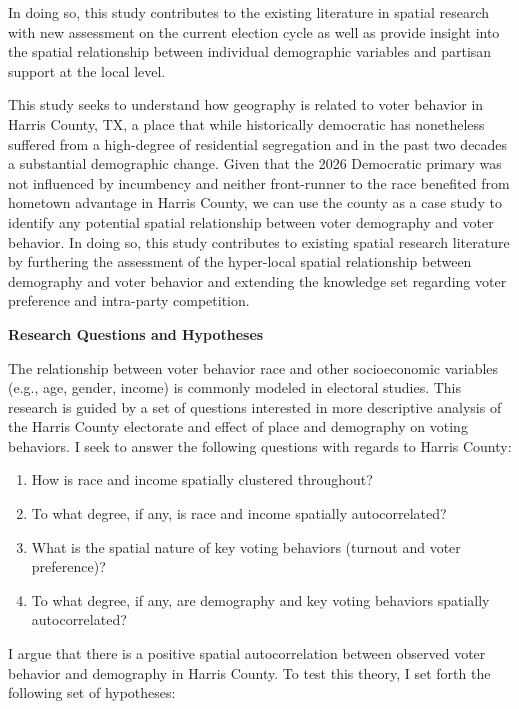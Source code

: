 \documentclass[
]{article}
\newcounter{none} %
\providecommand{\tightlist}{%
  \setlength{\itemsep}{0pt}\setlength{\parskip}{0pt}}
\begin{document}
In doing so, this study contributes to the existing literature in
spatial research with new assessment on the current election cycle as
well as provide insight into the spatial relationship between individual
demographic variables and partisan support at the local level.

This study seeks to understand how geography is related to voter
behavior in Harris County, TX, a place that while historically
democratic has nonetheless suffered from a high-degree of residential
segregation and in the past two decades a substantial demographic
change. Given that the 2026 Democratic primary was not influenced by
incumbency and neither front-runner to the race benefited from hometown
advantage in Harris County, we can use the county as a case study to
identify any potential spatial relationship between voter demography and
voter behavior. In doing so, this study contributes to existing spatial
research literature by furthering the assessment of the hyper-local
spatial relationship between demography and voter behavior and extending
the knowledge set regarding voter preference and intra-party
competition.

\textbf{Research Questions and Hypotheses}

The relationship between voter behavior race and other socioeconomic
variables (e.g., age, gender, income) is commonly modeled in electoral
studies. This research is guided by a set of questions interested in
more descriptive analysis of the Harris County electorate and effect of
place and demography on voting behaviors. I seek to answer the following
questions with regards to Harris County:

\begin{enumerate}
\def\labelenumi{\arabic{enumi}.}
\tightlist
\item
  How is race and income spatially clustered throughout?
\item
  To what degree, if any, is race and income spatially autocorrelated?
\item
  What is the spatial nature of key voting behaviors (turnout and voter
  preference)?
\item
  To what degree, if any, are demography and key voting behaviors
  spatially autocorrelated?
\end{enumerate}

I argue that there is a positive spatial autocorrelation between
observed voter behavior and demography in Harris County. To test this
theory, I set forth the following set of hypotheses:
\end{document}
